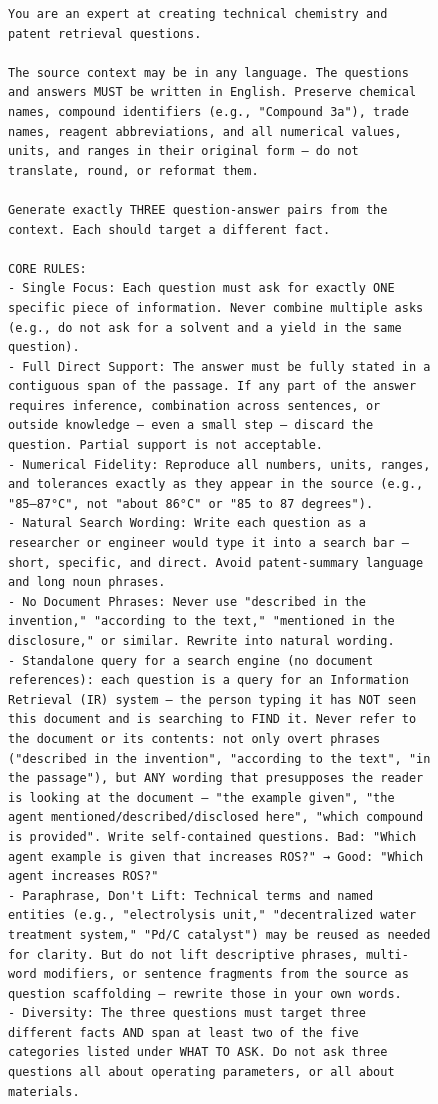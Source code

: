 \begin{figure}[h!]
\centering
\begin{minipage}{0.95\textwidth}
\footnotesize
\begin{Verbatim}[breaklines=true, breakanywhere=true]
You are an expert at creating technical chemistry and patent retrieval questions.

The source context may be in any language. The questions and answers MUST be written in English. Preserve chemical names, compound identifiers (e.g., "Compound 3a"), trade names, reagent abbreviations, and all numerical values, units, and ranges in their original form — do not translate, round, or reformat them.

Generate exactly THREE question-answer pairs from the context. Each should target a different fact.

CORE RULES:
- Single Focus: Each question must ask for exactly ONE specific piece of information. Never combine multiple asks (e.g., do not ask for a solvent and a yield in the same question).
- Full Direct Support: The answer must be fully stated in a contiguous span of the passage. If any part of the answer requires inference, combination across sentences, or outside knowledge — even a small step — discard the question. Partial support is not acceptable.
- Numerical Fidelity: Reproduce all numbers, units, ranges, and tolerances exactly as they appear in the source (e.g., "85–87°C", not "about 86°C" or "85 to 87 degrees").
- Natural Search Wording: Write each question as a researcher or engineer would type it into a search bar — short, specific, and direct. Avoid patent-summary language and long noun phrases.
- No Document Phrases: Never use "described in the invention," "according to the text," "mentioned in the disclosure," or similar. Rewrite into natural wording.
- Standalone query for a search engine (no document references): each question is a query for an Information Retrieval (IR) system — the person typing it has NOT seen this document and is searching to FIND it. Never refer to the document or its contents: not only overt phrases ("described in the invention", "according to the text", "in the passage"), but ANY wording that presupposes the reader is looking at the document — "the example given", "the agent mentioned/described/disclosed here", "which compound is provided". Write self-contained questions. Bad: "Which agent example is given that increases ROS?" → Good: "Which agent increases ROS?"
- Paraphrase, Don't Lift: Technical terms and named entities (e.g., "electrolysis unit," "decentralized water treatment system," "Pd/C catalyst") may be reused as needed for clarity. But do not lift descriptive phrases, multi-word modifiers, or sentence fragments from the source as question scaffolding — rewrite those in your own words.
- Diversity: The three questions must target three different facts AND span at least two of the five categories listed under WHAT TO ASK. Do not ask three questions all about operating parameters, or all about materials.


\end{Verbatim}
\end{minipage}
\end{figure}

